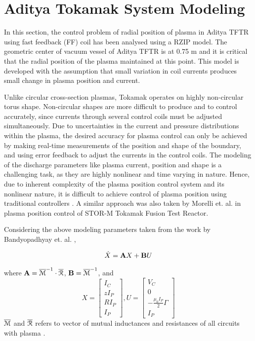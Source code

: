 \section{Aditya Tokamak System Modeling}
In this section, the control problem of radial position of plasma in Aditya TFTR using fast feedback (FF) coil has been analysed using a RZIP model. The geometric center of vacuum vessel of Aditya TFTR is at 0.75 m and it is critical that the radial position of the plasma maintained at this point. This model is developed with the assumption that small variation in coil currents produces small change in plasma position and current.  

Unlike circular cross-section plasmas, Tokamak operates on highly non-circular torus shape. Non-circular shapes are more difficult to produce and to control accurately, since currents through several control coils must be adjusted simultaneously\cite{Bishop1995}. Due to uncertainties in the current and pressure distributions within the plasma, the desired accuracy for plasma control can only be achieved by making real-time measurements of the position and shape of the boundary, and using error feedback to adjust the currents in the control coils. The modeling of the discharge parameters like plasma current, position and shape is a challenging task, as they are highly nonlinear and time varying in nature. Hence, due to inherent complexity of the plasma position control system and its nonlinear nature, it is difficult to achieve control of plasma position using traditional controllers \cite{Suratia2012}. A similar approach was also taken by Morelli et. al. \cite{Morelli2005b} in plasma position control of STOR-M Tokamak Fusion Test Reactor.

Considering the above modeling parameters taken from the work by Bandyopadhyay et. al. \cite{Bandyopadhyay2001,bandyopadhyaya2006},

\begin{equation}
\dot{X}={\bf A}X + {\bf B}U
\end{equation}

where ${\bf A}={\overline{\cal{M}}}^{-1}\cdot{\overline{\cal{R}}}$, 
${\bf B}={\overline{\cal{M}}}^{-1}$,  and
\[X = \left[ {\begin{array}{*{20}{c}}
	{{I_C}}\\
	{z{I_P}}\\
	{R{I_P}}\\
	{{I_P}}
	\end{array}} \right],U = \left[ {\begin{array}{*{20}{c}}
	{{V_C}}\\
	0\\
	{ - \frac{{{\mu _0}{I_P}}}{2}\Gamma }\\
	{{I_P}}
	\end{array}} \right]\]
$ \overline{\cal{M}} $ and $ \overline{\cal{R}} $ refers to vector of mutual inductances and resistances of all circuits with plasma \cite{bandyopadhyaya2004,bandyopadhyaya2006,Suratia2012}. 

